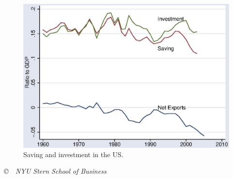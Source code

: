\documentclass[letterpaper,12pt]{article}
\begin{document}
\begin{enumerate}
\begin{figure}
    \centering
    \includegraphics[scale=0.8]{usflows.eps}
    \caption{Saving and investment in the US.}
    \label{fig:us}%
\end{figure}


\end{enumerate}


\vfill \centerline{\it \copyright \ \number\year \ 
NYU Stern School of Business}
\end{document}
